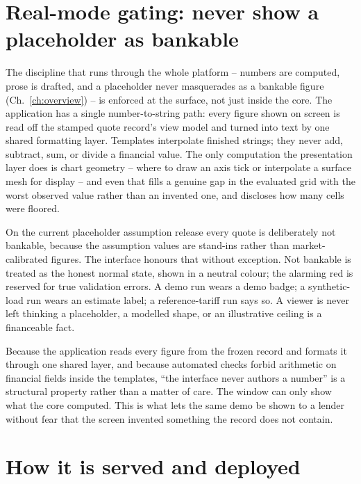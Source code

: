 \section{Real-mode gating: never show a placeholder as bankable}

The discipline that runs through the whole platform -- numbers are computed, prose is drafted, and a placeholder never masquerades as a bankable figure (Ch.~\ref{ch:overview}) -- is enforced at the surface, not just inside the core. The application has a single number-to-string path: every figure shown on screen is read off the stamped quote record's view model and turned into text by one shared formatting layer. Templates interpolate finished strings; they never add, subtract, sum, or divide a financial value. The only computation the presentation layer does is chart geometry -- where to draw an axis tick or interpolate a surface mesh for display -- and even that fills a genuine gap in the evaluated grid with the worst observed value rather than an invented one, and discloses how many cells were floored.

On the current placeholder assumption release every quote is deliberately not bankable, because the assumption values are stand-ins rather than market-calibrated figures. The interface honours that without exception. Not bankable is treated as the honest normal state, shown in a neutral colour; the alarming red is reserved for true validation errors. A demo run wears a demo badge; a synthetic-load run wears an estimate label; a reference-tariff run says so. A viewer is never left thinking a placeholder, a modelled shape, or an illustrative ceiling is a financeable fact.

\begin{keyidea}
Because the application reads every figure from the frozen record and formats it through one shared layer, and because automated checks forbid arithmetic on financial fields inside the templates, ``the interface never authors a number'' is a structural property rather than a matter of care. The window can only show what the core computed. This is what lets the same demo be shown to a lender without fear that the screen invented something the record does not contain.
\end{keyidea}

\section{How it is served and deployed}

